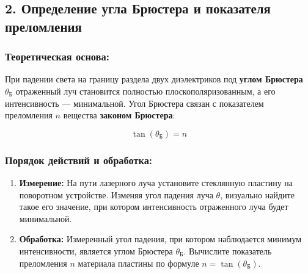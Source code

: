 \subsection*{2. Определение угла Брюстера и показателя преломления}

\subsubsection*{Теоретическая основа:}
При падении света на границу раздела двух диэлектриков под \textbf{углом Брюстера} $\theta_Б$ отраженный луч становится полностью плоскополяризованным, а его интенсивность --- минимальной. Угол Брюстера связан с показателем преломления $n$ вещества \textbf{законом Брюстера}:

\begin{equation}
    \tan(\theta_\text{Б}) = n
    \label{eq:bruster_law}
\end{equation}

\subsubsection*{Порядок действий и обработка:}
\begin{enumerate}
    \item \textbf{Измерение:} На пути лазерного луча установите стеклянную пластину на поворотном устройстве. Изменяя угол падения луча $\theta$, визуально найдите такое его значение, при котором интенсивность отраженного луча будет минимальной.
    
    \item \textbf{Обработка:} Измеренный угол падения, при котором наблюдается минимум интенсивности, является углом Брюстера $\theta_\text{Б}$. Вычислите показатель преломления $n$ материала пластины по формуле $n = \tan(\theta_\text{Б})$.
\end{enumerate}



















\newpage
{}


